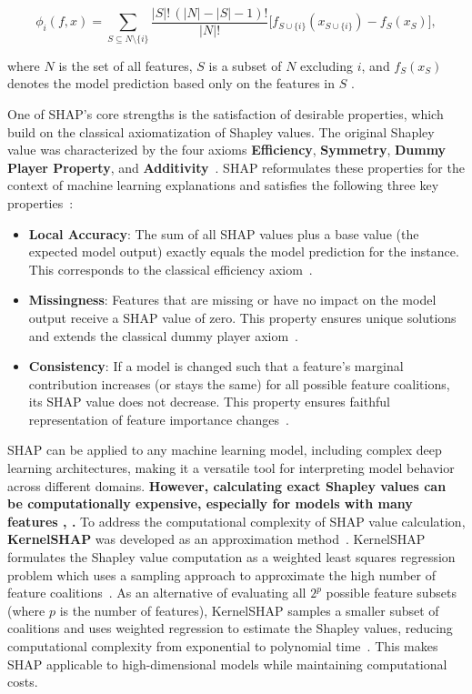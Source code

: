 \[
\phi_i(f, x) = 
\sum_{S \subseteq N \setminus \{i\}} 
\frac{|S|!\,(|N|-|S|-1)!}{|N|!} 
\Big[ f_{S \cup \{i\}}(x_{S \cup \{i\}}) - f_S(x_S) \Big],
\]

where $N$ is the set of all features, $S$ is a subset of $N$ excluding $i$, and 
$f_S(x_S)$ denotes the model prediction based only on the features in $S$ 
\cite{lundberg2017shap}.

One of SHAP's core strengths is the satisfaction of desirable properties, which build on the classical axiomatization of Shapley values. The original Shapley value was characterized by the four axioms \textbf{Efficiency}, \textbf{Symmetry}, \textbf{Dummy Player Property}, and \textbf{Additivity}~\cite{shapley1953value}. SHAP reformulates these properties for the context of machine learning explanations and satisfies the following three key properties~\cite{lundberg2017shap}:

\begin{itemize}
    \item \textbf{Local Accuracy}: The sum of all SHAP values plus a base value (the expected model output) exactly equals the model prediction for the instance. This corresponds to the classical efficiency axiom~\cite{lundberg2017shap}.
    \item \textbf{Missingness}: Features that are missing or have no impact on the model output receive a SHAP value of zero. This property ensures unique solutions and extends the classical dummy player axiom~\cite{lundberg2017shap}.
    \item \textbf{Consistency}: If a model is changed such that a feature's marginal contribution increases (or stays the same) for all possible feature coalitions, its SHAP value does not decrease. This property ensures faithful representation of feature importance changes~\cite{lundberg2017shap}.
\end{itemize}

SHAP can be applied to any machine learning model, including complex deep learning architectures, making it a versatile tool for interpreting model behavior across different domains. \textbf{However, calculating exact Shapley values can be computationally expensive, especially for models with many features \cite{rozemberczki2022shapley}, \cite{aas2021explaining}.}  To address the computational complexity of SHAP value calculation, \textbf{KernelSHAP} was developed as an approximation method~\cite{lundberg2017shap}. KernelSHAP formulates the Shapley value computation as a weighted least squares regression problem which uses a sampling approach to approximate the high number of feature coalitions~\cite{covert2021}. As an alternative of evaluating all $2^p$ possible feature subsets (where $p$ is the number of features), KernelSHAP samples a smaller subset of coalitions and uses weighted regression to estimate the Shapley values, reducing computational complexity from exponential to polynomial time~\cite{rozemberczki2022shapley}. This makes SHAP applicable to high-dimensional models while maintaining computational costs.

